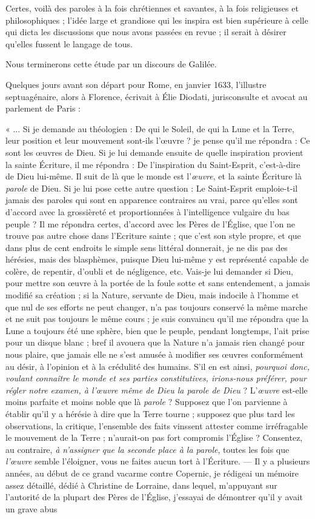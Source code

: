 \documentclass[a4paper, 11pt, oneside]{article}
\begin{document}
Certes, voilà des paroles à la fois chrétiennes et savantes, à la fois religieuses et philosophiques ; l'idée large et grandiose qui les inspira est bien supérieure à celle qui dicta les discussions que nous avons passées en revue ; il serait à désirer qu'elles fussent le langage de tous.

Nous terminerons cette étude par un discours de Galilée.

Quelques jours avant son départ pour Rome, en janvier 1633, l'illustre septuagénaire, alors à Florence, écrivait à Élie Diodati, jurisconsulte et avocat au parlement de Paris :

« ... Si je demande au théologien : De qui le Soleil, de qui la Lune et la Terre, leur position et leur mouvement sont-ils l'œuvre ? je pense qu'il me répondra : Ce sont les œuvres de Dieu. Si je lui demande ensuite de quelle inspiration provient la sainte Écriture, il me répondra : De l'inspiration du Saint-Esprit, c'est-à-dire de Dieu lui-même. Il suit de là que le monde est l'\emph{œuvre}, et la sainte Écriture là \emph{parole} de Dieu. Si je lui pose cette autre question : Le Saint-Esprit emploie-t-il jamais des paroles qui sont en apparence contraires au vrai, parce qu'elles sont d'accord avec la grossièreté et proportionnées à l'intelligence vulgaire du bas peuple ? Il me répondra certes, d'accord avec les Pères de l'Église, que l'on ne trouve pas autre chose dans l'Ecriture sainte ; que c'est son style propre, et que dans plus de cent endroits le simple sens littéral donnerait, je ne dis pas des hérésies, mais des blasphèmes, puisque Dieu lui-même y est représenté capable de colère, de repentir, d'oubli et de négligence, etc. Vais-je lui demander si Dieu, pour mettre son œuvre à la portée de la foule sotte et sans entendement, a jamais modifié sa création ; si la Nature, servante de Dieu, mais indocile à l'homme et que nul de ses efforts ne peut changer, n'a pas toujours conservé la même marche et ne suit pas toujours le même cours ; je suis convaincu qu'il me répondra que la Lune a toujours été une sphère, bien que le peuple, pendant longtemps, l'ait prise pour un disque blanc ; bref il avouera que la Nature n'a jamais rien changé pour nous plaire, que jamais elle ne s'est amusée à modifier ses œuvres conformément au désir, à l'opinion et à la crédulité des humains. S'il en est ainsi, \emph{pourquoi donc, voulant connaître le monde et ses parties constitutives, irions-nous préférer, pour régler notre examen, à l'œuvre même de Dieu la parole de Dieu} ? L'\emph{œuvre} est-elle moins parfaite et moins noble que là \emph{parole} ? Supposez que l'on parvienne à établir qu'il y a hérésie à dire que la Terre tourne ; supposez que plus tard les observations, la critique, l'ensemble des faits vinssent attester comme irréfragable le mouvement de la Terre ; n'aurait-on pas fort compromis l'Église ? Consentez, au contraire, \emph{à n'assigner que la seconde place à la parole}, toutes les fois que \emph{l'œuvre} semble l'éloigner, vous ne faites aucun tort à l'Écriture. --- Il y a plusieurs années, au début de ce grand vacarme contre Copernic, je rédigeai un mémoire assez détaillé, dédié à Christine de Lorraine, dans lequel, m'appuyant sur l'autorité de la plupart des Pères de l'Église, j'essayai de démontrer qu'il y avait un grave abus 
\end{document}
